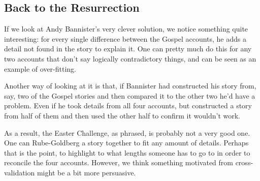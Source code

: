 

\subsection{Back to the Resurrection}\label{back-to-the-resurrection}

If we look at Andy Bannister's very clever solution, we notice something
quite interesting: for every single difference between the Gospel
accounts, he adds a detail not found in the story to explain it. One can
pretty much do this for any two accounts that don't say logically
contradictory things, and can be seen as an example of over-fitting. 

Another way of looking at it is that, if Bannister had constructed his story from, say, two of the Gospel stories and then compared it to the other two he'd have a problem.  Even if he took details from all four accounts, but constructed a story from half of them and then used the other half to confirm it wouldn't work.

As a result, the Easter Challenge, as phrased, is probably not a very good one. One can Rube-Goldberg a story together to fit any amount of details.  Perhaps that is the point, to highlight to what lengths someone has to go to in order to reconcile the four accounts.  However, we think something motivated from cross-validation might be a bit more persuasive.
